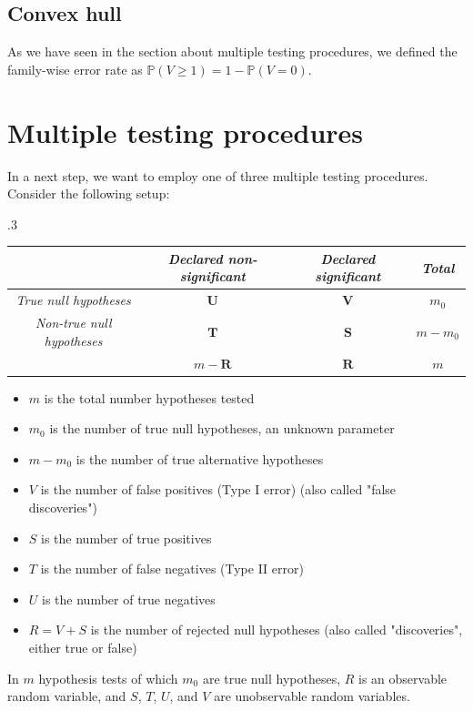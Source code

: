 \documentclass[a4paper,12pt]{article}
\theoremstyle{plain}
\theoremstyle{definition}
\theoremstyle{remark}
\begin{document}
\subsection{Convex hull}

As we have seen in the section about multiple testing procedures, we defined the family-wise error rate as $\mathbb{P}(V \geq 1) = 1 - \mathbb{P}(V = 0)$.

\newpage

\section{Multiple testing procedures}

In a next step, we want to employ one of three multiple testing procedures. Consider the following setup:
\begin{table}[h]
	\tymax .3\textwidth
	\begin{tabulary}{\textwidth}{|CCCC|}
		\hline
		& \textit{Declared non-significant} & \textit{Declared significant} & \textit{Total} \\
		\hline
		\textit{True null hypotheses} & $\mathbf{U}$ & $\mathbf{V}$ & $m_0$ \\
		\textit{Non-true null hypotheses} & $\mathbf{T}$ & $\mathbf{S}$ & $m - m_0$ \\
		& $m - \mathbf{R}$ & $\mathbf{R}$ & $m$ \\
		\hline
	\end{tabulary}
\end{table}

\begin{itemize}
	\item $m$ is the total number hypotheses tested
	\item $m_0$ is the number of true null hypotheses, an unknown parameter
	\item $m - m_0$ is the number of true alternative hypotheses
	\item $V$ is the number of false positives (Type I error) (also called "false discoveries")
	\item $S$ is the number of true positives
	\item $T$ is the number of false negatives (Type II error)
	\item $U$ is the number of true negatives
	\item $R = V + S$ is the number of rejected null hypotheses (also called "discoveries", either true or false)
\end{itemize}
In $m$ hypothesis tests of which $m_0$ are true null hypotheses, $R$ is an observable random variable, and $S$, $T$, $U$, and $V$ are unobservable random variables.
\end{document}

